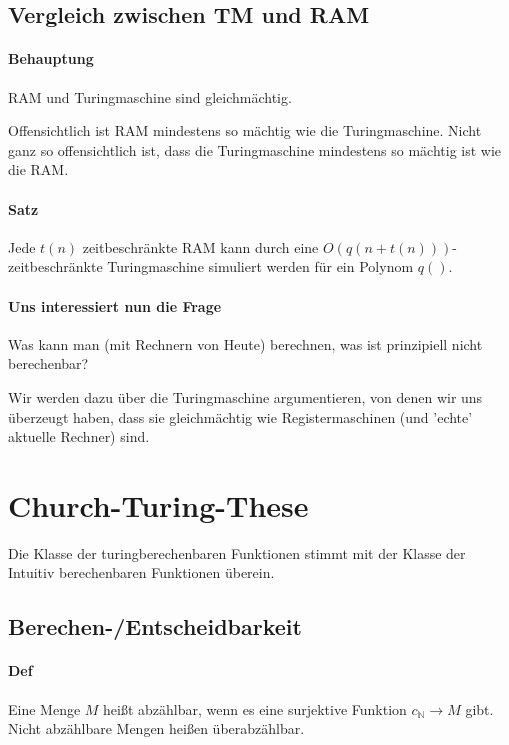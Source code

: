 \subsection{Vergleich zwischen TM und RAM}

\paragraph*{Behauptung} RAM und Turingmaschine sind gleichmächtig.

\par\medskip Offensichtlich ist RAM mindestens so mächtig wie die Turingmaschine. Nicht ganz so offensichtlich ist, dass die Turingmaschine mindestens so mächtig ist wie die RAM.\par\medskip

\paragraph*{Satz} Jede $t(n)$ zeitbeschränkte RAM kann durch eine $O(q(n+t(n)))$-zeitbeschränkte Turingmaschine simuliert werden für ein Polynom $q()$.

\paragraph*{Uns interessiert nun die Frage} Was kann man (mit Rechnern von Heute) berechnen, was ist prinzipiell nicht berechenbar?

\par\medskip Wir werden dazu über die Turingmaschine argumentieren, von denen wir uns überzeugt haben, dass sie gleichmächtig wie Registermaschinen (und 'echte' aktuelle Rechner) sind.\par\medskip

\section{Church-Turing-These}

Die Klasse der turingberechenbaren Funktionen stimmt mit der Klasse der Intuitiv berechenbaren Funktionen überein.

\subsection{Berechen-/Entscheidbarkeit}
\paragraph*{Def} Eine Menge $M$ heißt abzählbar, wenn es eine surjektive Funktion $c_\mathbb{N}\rightarrow M$ gibt. Nicht abzählbare Mengen heißen überabzählbar.

